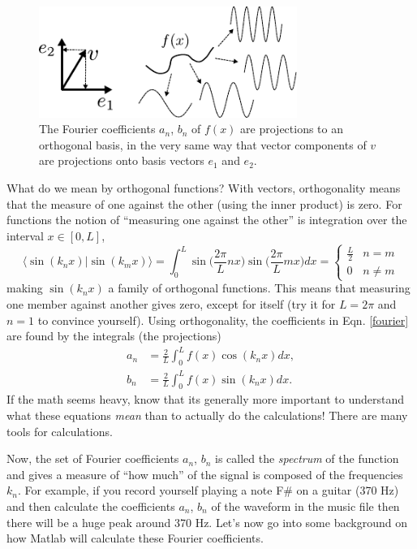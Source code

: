 \documentclass[12pt]{article}
\begin{document}
\begin{figure}[h]
  \centering
  \includegraphics[width=0.75\textwidth]{fourier_projection}
  \caption{The Fourier coefficients $a_n$, $b_n$ of $f(x)$ are projections to an orthogonal basis, in the very same way that vector components of $v$ are projections onto basis vectors $e_1$ and $e_2$.}\label{proj}
\end{figure}

What do we mean by orthogonal functions? With vectors, orthogonality means that the measure of one against the other (using the inner product) is zero. For functions the notion of ``measuring one against the other'' is integration over the interval $x\in [0,L]$,
\begin{equation}
  \langle \sin(k_nx)|\sin(k_mx)\rangle = \int_0^L \sin\Big(\frac{2\pi}{L}nx\Big)\sin\Big(\frac{2\pi}{L}mx\Big)dx = \begin{cases} \frac{L}{2} & n=m\\
    0 & n\neq m\end{cases}
\end{equation}
making $\sin(k_nx)$ a family of orthogonal functions. This means that measuring one member against another gives zero, except for itself (try it for $L = 2\pi$ and $n=1$ to convince yourself). Using orthogonality, the coefficients in Eqn. \ref{fourier} are found by the integrals (the projections)
\begin{align}
  a_n &= \frac{2}{L}\int_0^L f(x)\cos(k_nx)dx,\label{f1}\\
  b_n &= \frac{2}{L}\int_0^L f(x)\sin(k_nx)dx.\label{f2}
\end{align}
If the math seems heavy, know that its generally more important to understand what these equations \textit{mean} than to actually do the calculations! There are many tools for calculations.

Now, the set of Fourier coefficients $a_n$, $b_n$ is called the \textit{spectrum} of the function and gives a measure of ``how much'' of the signal is composed of the frequencies $k_n$. For example, if you record yourself playing a note F\# on a guitar (370 Hz) and then calculate the coefficients $a_n$, $b_n$ of the waveform in the music file then there will be a huge peak around 370 Hz. Let's now go into some background on how Matlab will calculate these Fourier coefficients.
\newpage
\end{document}

